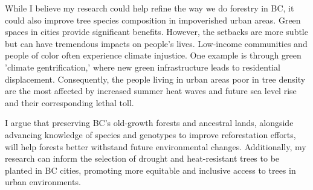 \documentclass[11pt,letter]{article}
\begin{document}
While I believe my research could help refine the way we do forestry in BC, it could also improve tree species composition in impoverished urban areas. Green spaces in cities provide significant benefits. However, the setbacks are more subtle but can have tremendous impacts on people's lives. Low-income communities and people of color often experience climate injustice. One example is through green 'climate gentrification,' where new green infrastructure leads to residential displacement. \citep{anguelovski_why_2019} Consequently, the people living in urban areas poor in tree density are the most affected by increased summer heat waves and future sea level rise and their corresponding lethal toll. \citep{anguelovski_why_2019,triffo_green_2022} 

I argue that preserving BC's old-growth forests and ancestral lands, alongside advancing knowledge of species and genotypes to improve reforestation efforts, will help forests better withstand future environmental changes. Additionally, my research can inform the selection of drought and heat-resistant trees to be planted in BC cities, promoting more equitable and inclusive access to trees in urban environments.

\end{document}
